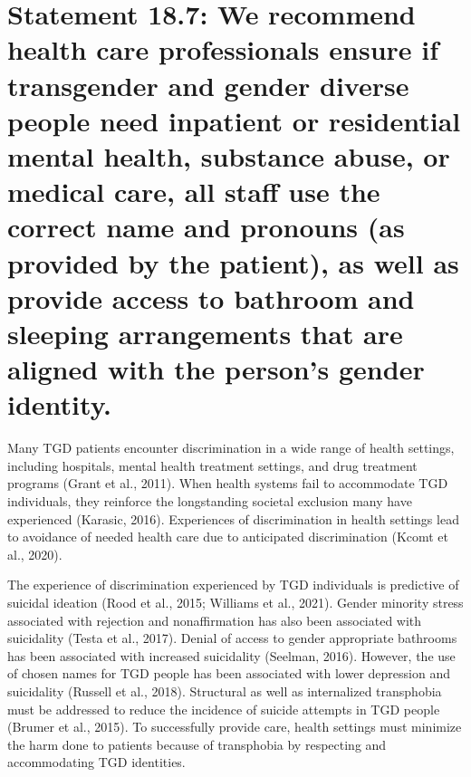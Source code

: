 \documentclass[
]{book}
\begin{document}
\hypertarget{statement-18.7-we-recommend-health-care-professionals-ensure-if-transgender-and-gender-diverse-people-need-inpatient-or-residential-mental-health-substance-abuse-or-medical-care-all-staff-use-the-correct-name-and-pronouns-as-provided-by-the-patient-as-well-as-provide-access-to-bathroom-and-sleeping-arrangements-that-are-aligned-with-the-persons-gender-identity.}{%
\section*{Statement 18.7: We recommend health care professionals ensure if transgender and gender diverse people need inpatient or residential mental health, substance abuse, or medical care, all staff use the correct name and pronouns (as provided by the patient), as well as provide access to bathroom and sleeping arrangements that are aligned with the person's gender identity.}\label{statement-18.7-we-recommend-health-care-professionals-ensure-if-transgender-and-gender-diverse-people-need-inpatient-or-residential-mental-health-substance-abuse-or-medical-care-all-staff-use-the-correct-name-and-pronouns-as-provided-by-the-patient-as-well-as-provide-access-to-bathroom-and-sleeping-arrangements-that-are-aligned-with-the-persons-gender-identity.}}

Many TGD patients encounter discrimination
in a wide range of health settings, including hospitals, mental health treatment settings, and drug
treatment programs (Grant et al., 2011). When
health systems fail to accommodate TGD individuals, they reinforce the longstanding societal
exclusion many have experienced (Karasic, 2016).
Experiences of discrimination in health settings
lead to avoidance of needed health care due to
anticipated discrimination (Kcomt et al., 2020).

The experience of discrimination experienced
by TGD individuals is predictive of suicidal ideation (Rood et al., 2015; Williams et al., 2021).
Gender minority stress associated with rejection
and nonaffirmation has also been associated with
suicidality (Testa et al., 2017). Denial of access
to gender appropriate bathrooms has been
associated with increased suicidality (Seelman,
2016). However, the use of chosen names for
TGD people has been associated with lower
depression and suicidality (Russell et al., 2018).
Structural as well as internalized transphobia
must be addressed to reduce the incidence of
suicide attempts in TGD people (Brumer et al.,
2015). To successfully provide care, health settings must minimize the harm done to patients
because of transphobia by respecting and accommodating TGD identities.
\end{document}
